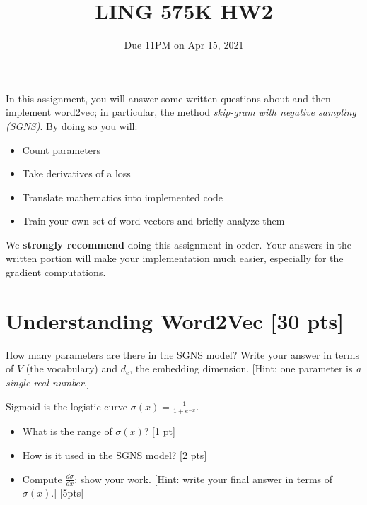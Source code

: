 \documentclass[11pt]{article}
\begin{document}
\title{LING 575K HW2}
\date{\vspace{-0.2in}Due 11PM on Apr 15, 2021}
\maketitle


In this assignment, you will answer some written questions about and then implement word2vec; in particular, the method \emph{skip-gram with negative sampling (SGNS)}.  By doing so you will:
\begin{itemize}
  \item Count parameters
  \item Take derivatives of a loss
  \item Translate mathematics into implemented code
  \item Train your own set of word vectors and briefly analyze them
\end{itemize}
We \textbf{strongly recommend} doing this assignment in order.  Your answers in the written portion will make your implementation much easier, especially for the gradient computations.


\section{Understanding Word2Vec [30 pts]}

  How many parameters are there in the SGNS model?  Write your answer in terms of $V$ (the vocabulary) and $d_e$, the embedding dimension.  [Hint: one parameter is \emph{a single real number}.]


\vspace{2em}
  Sigmoid is the logistic curve $\sigma(x) = \frac{1}{1+e^{-x}}$.
\begin{itemize}
  \item What is the range of $\sigma(x)$? [1 pt]
  \item How is it used in the SGNS model? [2 pts]
  \item Compute $\frac{d\sigma}{dx}$; show your work.  [Hint: write your final answer in terms of $\sigma(x)$.] [5pts]
\end{itemize}
\end{document}
